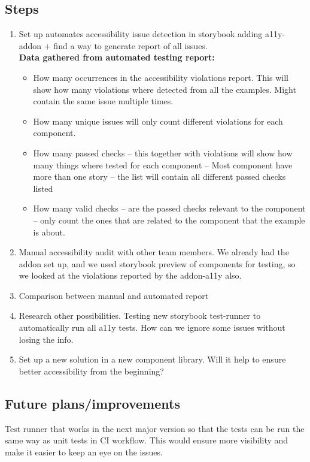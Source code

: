 \subsection{Steps}
\begin{enumerate}
	\item Set up automates accessibility issue detection in storybook
	adding a11y-addon + find a way to generate report of all issues. \\
	\textbf{Data gathered from automated testing report:}
	\begin{itemize}
		\item How many occurrences in the accessibility violations report. This will show how many violations where detected from all the examples. Might contain the same issue multiple times.
		\item How many unique issues will only count different violations for each component.
		\item How many passed checks – this together with violations will show how many things where tested for each component – Most component have more than one story – the list will contain all different passed checks listed
		\item How many valid checks – are the passed checks relevant to the component – only count the ones that are related to the component that the example is about.
	\end{itemize}
	\item Manual accessibility audit with other team members. We already had the addon set up, and we used storybook preview of components for testing, so we looked at the violations reported by the addon-a11y also.
	\item Comparison between manual and automated report
	\item Research other possibilities. Testing new storybook test-runner to automatically run all a11y tests. How can we ignore some issues without losing the info.
	\item Set up a new solution in a new component library. Will it help to ensure better accessibility from the beginning?
\end{enumerate}

\subsection{Future plans/improvements}
Test runner that works in the next major version so that the tests can be run the same way as unit tests in CI workflow. This would ensure more visibility and make it easier to keep an eye on the issues.